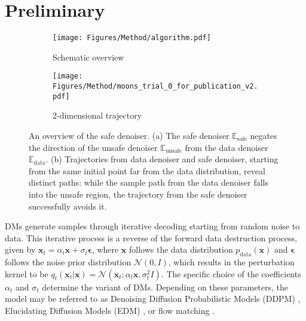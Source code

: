 \section{Preliminary}
\label{preliminary}

\begin{figure*}[t]{
    \centering
        \begin{subfigure}{0.49\textwidth}
            \texttt{[image: Figures/Method/algorithm.pdf]}
            \caption{Schematic overview}
        \end{subfigure}    
        \begin{subfigure}{0.49\textwidth}
            \texttt{[image: Figures/Method/moons\_trial\_0\_for\_publication\_v2.pdf]}
            \caption{2-dimensional trajectory}
        \end{subfigure}
    \caption{An overview of the safe denoiser. (a) The safe denoiser $\mathbb{E}_{\text{safe}}$ negates the direction of the unsafe denoiser $\mathbb{E}_{\text{unsafe}}$ from the data denoiser $\mathbb{E}_{\text{data}}$. (b) Trajectories from data denoiser and safe denoiser, starting from the same initial point far from the data distribution, reveal distinct paths: while the sample path from the data denoiser falls into the unsafe region, the trajectory from the safe denoiser successfully avoids it.}
    \label{fig:schematic}
}
\end{figure*}

%
%
DMs generate samples through iterative decoding starting from random noise to data. This iterative process is a reverse of the forward data destruction process, 
given by  $\mathbf{x}_{t}=\alpha_{t}\mathbf{x}+\sigma_{t}\bm{\epsilon}$, where $\mathbf{x}$ follows the data distribution $p_{\text{data}}(\mathbf{x})$ and $\bm{\epsilon}$ follows the noise prior distribution $\mathcal{N}(0,I)$, which results in the perturbation kernel to be $q_{t}(\mathbf{x}_{t}\vert\mathbf{x})=\mathcal{N}(\mathbf{x}_{t};\alpha_{t}\mathbf{x},\sigma_{t}^{2}I)$. The specific choice of the coefficients $\alpha_{t}$ and $\sigma_{t}$ determine the variant of DMs. Depending on these parameters, the model may be referred to as Denoising Diffusion Probabilistic Models (DDPM) \cite{ho2020denoising}, Elucidating Diffusion Models (EDM) \cite{karras2022elucidating}, or flow matching \cite{lipman2022flow}. 

